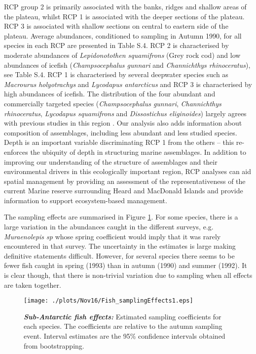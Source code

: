 \documentclass{statsoc}
\begin{document}
RCP group 2 is primarily associated with the banks, ridges and shallow areas of the plateau, whilst RCP 1 is associated with the deeper sections of the plateau. RCP 3 is associated with shallow sections on central to eastern side of the plateau. Average abundances, conditioned to sampling in Autumn 1990, for all species in each RCP are presented in Table S.4. RCP 2 is characterised by moderate abundances of \textit{Lepidonotothen squamifrons} (Grey rock cod) and low abundances of icefish (\textit{Champsocephalus gunnari} and \textit{Channichthys rhinoceratus}), see Table S.4. RCP 1 is characterised by several deepwater species such as \textit{Macrourus holyotrachys} and \textit{Lycodapus antarcticus} and RCP 3 is characterised by high abundances of icefish. The distribution of the four abundant and commercially targeted species (\textit{Champsocephalus gunnari}, \textit{Channichthys rhinoceratus}, \textit{Lycodapus squamifrons} and \textit{Dissostichus eliginoides}) largely agrees with previous studies in this region \citep{wil95,del98}. Our analysis also adds information about composition of assemblages, including less abundant and less studied species. Depth is an important variable discriminating RCP 1 from the others -- this re-enforces the ubiquity of depth in structuring marine assemblages. In addition to improving our understanding of the structure of assemblages and their environmental drivers in this ecologically important region, RCP analyses can aid spatial management by providing an assessment of the representativeness of the current Marine reserve surrounding Heard and MacDonald Islands \citep{hil16} and provide information to support ecosystem-based management.

The sampling effects are summarised in Figure \ref{figKerguelenSamp}. For some species, there is a large variation in the abundances caught in the different surveys, e.g. \textit{Muraenolepis sp} whose spring coefficient would imply that it was rarely encountered in that survey. The uncertainty in the estimates is large making definitive statements difficult. However, for several species there seems to be fewer fish caught in spring (1993) than in autumn (1990) and summer (1992). It is clear though, that there is non-trivial variation due to sampling when all effects are taken together.
\begin{figure}
 \centering
 \texttt{[image: ./plots/Nov16/Fish\_samplingEffects1.eps]}
 \caption{\label{figKerguelenSamp}\textbf{\textit{Sub-Antarctic fish effects:}} Estimated sampling coefficients for each species. The coefficients are relative to the autumn sampling event. Interval estimates are the 95\% confidence intervals obtained from bootstrapping.}
\end{figure}
\end{document}
